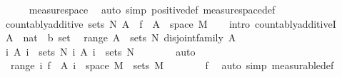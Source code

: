 \begin{isabellebody}
\ \ \ \ \isamarkupfalse%
\ measure{\isacharunderscore}{\kern0pt}space\ \isamarkupfalse%
\ {\isacharparenleft}{\kern0pt}auto\ simp{\isacharcolon}{\kern0pt}\ positive{\isacharunderscore}{\kern0pt}def\ measure{\isacharunderscore}{\kern0pt}space{\isacharunderscore}{\kern0pt}def{\isacharparenright}{\kern0pt}\isanewline
\ \ \isamarkupfalse%
\ {\isachardoublequoteopen}countably{\isacharunderscore}{\kern0pt}additive\ {\isacharparenleft}{\kern0pt}sets\ N{\isacharparenright}{\kern0pt}\ {\isacharparenleft}{\kern0pt}{\isasymlambda}A{\isachardot}{\kern0pt}\ {\isasymmu}\ {\isacharparenleft}{\kern0pt}f\ {\isacharminus}{\kern0pt}{\isacharbackquote}{\kern0pt}\ A\ {\isasyminter}\ space\ M{\isacharparenright}{\kern0pt}{\isacharparenright}{\kern0pt}{\isachardoublequoteclose}\isanewline
\ \ \isamarkupfalse%
\ {\isacharparenleft}{\kern0pt}intro\ countably{\isacharunderscore}{\kern0pt}additiveI{\isacharparenright}{\kern0pt}\isanewline
\ \ \ \ \isamarkupfalse%
\ A\ {\isacharcolon}{\kern0pt}{\isacharcolon}{\kern0pt}\ {\isachardoublequoteopen}nat\ {\isasymRightarrow}\ {\isacharprime}{\kern0pt}b\ set{\isachardoublequoteclose}\ \isamarkupfalse%
\ {\isachardoublequoteopen}range\ A\ {\isasymsubseteq}\ sets\ N{\isachardoublequoteclose}\ {\isachardoublequoteopen}disjoint{\isacharunderscore}{\kern0pt}family\ A{\isachardoublequoteclose}\isanewline
\ \ \ \ \isamarkupfalse%
\ \isamarkupfalse%
\ {\isachardoublequoteopen}{\isasymAnd}i{\isachardot}{\kern0pt}\ A\ i\ {\isasymin}\ sets\ N{\isachardoublequoteclose}\ {\isachardoublequoteopen}{\isacharparenleft}{\kern0pt}{\isasymUnion}i{\isachardot}{\kern0pt}\ A\ i{\isacharparenright}{\kern0pt}\ {\isasymin}\ sets\ N{\isachardoublequoteclose}\isanewline
\ \ \ \ \ \ \isamarkupfalse%
\ auto\isanewline
\ \ \ \ \isamarkupfalse%
\ \isamarkupfalse%
\ {\isacharasterisk}{\kern0pt}{\isacharcolon}{\kern0pt}\ {\isachardoublequoteopen}range\ {\isacharparenleft}{\kern0pt}{\isasymlambda}i{\isachardot}{\kern0pt}\ f\ {\isacharminus}{\kern0pt}{\isacharbackquote}{\kern0pt}\ {\isacharparenleft}{\kern0pt}A\ i{\isacharparenright}{\kern0pt}\ {\isasyminter}\ space\ M{\isacharparenright}{\kern0pt}\ {\isasymsubseteq}\ sets\ M{\isachardoublequoteclose}\isanewline
\ \ \ \ \ \ \isamarkupfalse%
\ f\ \isamarkupfalse%
\ {\isacharparenleft}{\kern0pt}auto\ simp{\isacharcolon}{\kern0pt}\ measurable{\isacharunderscore}{\kern0pt}def{\isacharparenright}{\kern0pt}\isanewline

\end{isabellebody}
